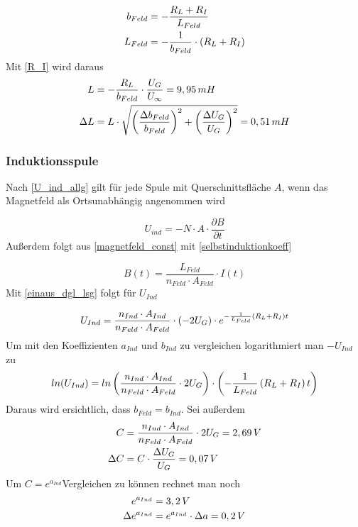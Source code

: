 \documentclass{article}
\begin{document}
\begin{align}
b_{Feld} &= - \frac{R_L + R_I}{L_{Feld}}
\notag
\\
L_{Feld} &= - \frac{1}{b_{Feld}} \cdot \left( R_L + R_I \right)
\notag
\end{align}
Mit \eqref{R_I} wird daraus 
\begin{align}
L &= - \frac{R_L}{b_{Feld}} \cdot \frac{U_G}{U_\infty} = 9,95 \, mH
\notag
\\
\Delta L &= 
L \cdot \sqrt{\left( \frac{\Delta b_{Feld}}{b_{Feld}} \right)^2 + \left( \frac{\Delta U_G}{U_G} \right)^2}
= 0,51 \, mH
\notag
\end{align}

\subsubsection{Induktionsspule}

Nach \eqref{U_ind_allg} gilt für jede Spule mit Querschnittsfläche \(A\), wenn das Magnetfeld als Ortsunabhängig angenommen wird

\begin{equation}
U_{ind} = -N \cdot A \cdot \frac{\partial B}{\partial t}
\label{U_induktionsspule}
\end{equation}
Außerdem folgt aus \eqref{magnetfeld_const} mit \eqref{selbstinduktionkoeff} 

\begin{equation}
B(t) = \frac{L_{Feld}}{n_{Feld} \cdot A_{Feld}} \cdot I(t)
\label{B_induktionsspule}
\end{equation}
Mit \eqref{einaus_dgl_lsg} folgt für \( U_{Ind} \)

\begin{equation}
U_{Ind} = \frac{n_{Ind} \cdot A_{Ind}}{n_{Feld} \cdot A_{Feld}}  \cdot \left(-2U_G \right) \cdot 
e^{-\frac{1}{L_{Feld}} \left( R_L + R_I \right)t}
\notag
\end{equation}
Um mit den Koeffizienten \(a_{Ind}\) und \(b_{Ind}\) zu vergleichen logarithmiert man \(-U_{Ind} \) zu
\begin{equation}
ln(U_{Ind}) = ln \left( \frac{n_{Ind} \cdot A_{Ind}}{n_{Feld} \cdot A_{Feld}}  \cdot 2U_G \right) \cdot \left( -\frac{1}{L_{Feld}} \left( R_L + R_I \right)t \right)
\notag
\end{equation}
Daraus wird ersichtlich, dass \(b_{Feld} = b_{Ind}\). Sei außerdem
\begin{align}
C &=  \frac{n_{Ind} \cdot A_{Ind}}{n_{Feld} \cdot A_{Feld}}  \cdot 2U_G = 2,69 \, V
\notag
\\
\Delta C &= C \cdot \frac{\Delta U_G}{U_G} = 0,07 \, V
\notag
\end{align}
Um \(C = e^{a_{Ind}} \)Vergleichen zu können rechnet man noch
\begin{align}
e^{a_{Ind}} &= 3,2 \, V
\notag
\\
\Delta e^{a_{Ind}} &= e^{a_{Ind}} \cdot \Delta a = 0,2 \, V
\notag
\end{align}
\end{document}
